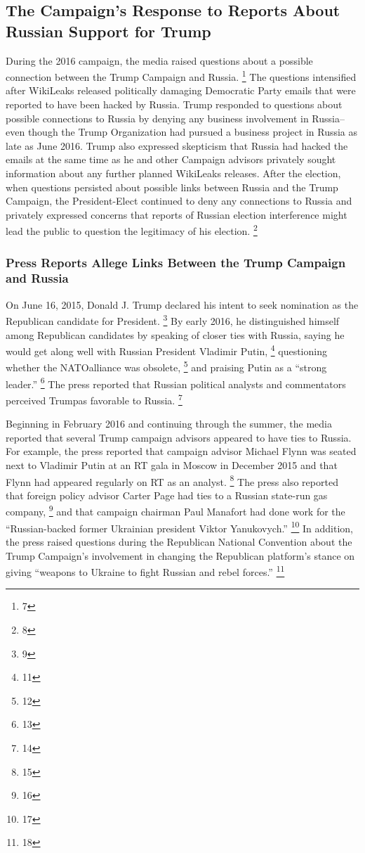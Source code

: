 \subsection{The Campaign's Response to Reports About Russian Support for Trump}
During the 2016 campaign, the media raised questions about a possible connection between the Trump Campaign and Russia.%
\footnote{7}
The questions intensified after WikiLeaks released politically damaging Democratic Party emails that were reported to have been hacked by Russia.
Trump responded to questions about possible connections to Russia by denying any business involvement in Russia--even though the Trump Organization had pursued a business project in Russia as late as June 2016.
Trump also expressed skepticism that Russia had hacked the emails at the same time as he and other Campaign advisors privately sought information about any further planned WikiLeaks releases.
After the election, when questions persisted about possible links between Russia and the Trump Campaign, the President-Elect continued to deny any connections to Russia and privately expressed concerns that reports of Russian election interference might lead the public to question the legitimacy of his election.%
\footnote{8}

\subsubsection{Press Reports Allege Links Between the Trump Campaign and Russia}
On June 16, 2015, Donald J. Trump declared his intent to seek nomination as the Republican candidate for President.%
\footnote{9}
By early 2016, he distinguished himself among Republican candidates by speaking of closer ties with Russia,%
saying he would get along well with Russian President Vladimir Putin,%
\footnote{11}
questioning whether the NATOalliance was obsolete,%
\footnote{12}
and praising Putin as a ``strong leader.''%
\footnote{13}
The press reported that Russian political analysts and commentators perceived Trumpas favorable to Russia.%
\footnote{14}

Beginning in February 2016 and continuing through the summer, the media reported that several Trump campaign advisors appeared to have ties to Russia.
For example, the press reported that campaign advisor Michael Flynn was seated next to Vladimir Putin at an RT gala in Moscow in December 2015 and that Flynn had appeared regularly on RT as an analyst.%
\footnote{15}
The press also reported that foreign policy advisor Carter Page had ties to a Russian state-run gas company,%
\footnote{16}
and that campaign chairman Paul Manafort had done work for the ``Russian-backed former Ukrainian president Viktor Yanukovych.''%
\footnote{17}
In addition, the press raised questions during the Republican National Convention about the Trump Campaign's involvement in changing the Republican platform's stance on giving ``weapons to Ukraine to fight Russian and rebel forces.''%
\footnote{18}

